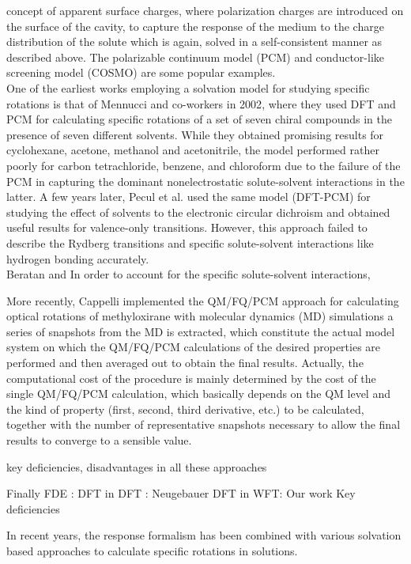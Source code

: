 concept of apparent surface charges\cite{}, where polarization charges are introduced on the surface of the 
cavity, to capture the response of the medium to the charge distribution of the solute which is again, 
solved in a self-consistent manner as described above. The polarizable continuum model (PCM) \cite{} and conductor-like 
screening model (COSMO) \cite{} are some popular examples.\\
One of the earliest works employing a solvation model for studying specific rotations is that of 
Mennucci and co-workers in 2002\cite{Mennucci02}, where they used DFT and PCM for calculating 
specific rotations of a set of seven chiral compounds in the presence of seven different 
solvents. While they obtained promising results for cyclohexane, acetone, methanol and 
acetonitrile, the model performed rather poorly for carbon tetrachloride, benzene, and chloroform
due to the failure of the PCM in capturing the dominant nonelectrostatic solute-solvent interactions 
in the latter. A few years later, Pecul et al.\cite{} used the same model (DFT-PCM) for studying the effect
of solvents to the electronic circular dichroism and obtained useful results for valence-only transitions. 
However, this approach failed to describe the Rydberg transitions and specific solute-solvent 
interactions like hydrogen bonding accurately.\\
Beratan and 
In order to account for the specific solute-solvent interactions, 



More recently, Cappelli implemented the
QM/FQ/PCM approach for calculating optical rotations of methyloxirane
with molecular dynamics (MD) simulations
 a series of snapshots from the MD is extracted, which constitute the actual model system on which the QM/FQ/PCM calculations of the desired properties are performed and then averaged out to obtain the final results. Actually, the computational cost of the procedure is mainly determined by the cost of the single QM/FQ/PCM calculation, which basically depends on the QM level and the kind of property (first, second, third derivative, etc.) to be calculated, together with the number of representative snapshots necessary to allow the final results to converge to a sensible value.

key deficiencies, disadvantages in all these approaches

Finally FDE : DFT in DFT : Neugebauer
DFT in WFT: Our work 
Key deficiencies

In recent years, the response formalism has been combined with various solvation based
approaches\cite{Neugebauer05,Neugebauer09,Mennucci02,Tomasi05,JensenGordon96}
to calculate specific rotations in solutions. 

